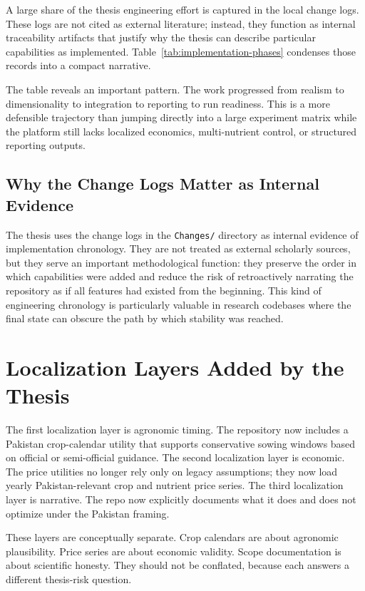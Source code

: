 A large share of the thesis engineering effort is captured in the local change logs. These logs are not cited as external literature; instead, they function as internal traceability artifacts that justify why the thesis can describe particular capabilities as implemented. Table~\ref{tab:implementation-phases} condenses those records into a compact narrative.



The table reveals an important pattern. The work progressed from realism to dimensionality to integration to reporting to run readiness. This is a more defensible trajectory than jumping directly into a large experiment matrix while the platform still lacks localized economics, multi-nutrient control, or structured reporting outputs.

\subsection{Why the Change Logs Matter as Internal Evidence}

The thesis uses the change logs in the \texttt{Changes/} directory as internal evidence of implementation chronology. They are not treated as external scholarly sources, but they serve an important methodological function: they preserve the order in which capabilities were added and reduce the risk of retroactively narrating the repository as if all features had existed from the beginning. This kind of engineering chronology is particularly valuable in research codebases where the final state can obscure the path by which stability was reached.

\section{Localization Layers Added by the Thesis}

The first localization layer is agronomic timing. The repository now includes a Pakistan crop-calendar utility that supports conservative sowing windows based on official or semi-official guidance. The second localization layer is economic. The price utilities no longer rely only on legacy assumptions; they now load yearly Pakistan-relevant crop and nutrient price series. The third localization layer is narrative. The repo now explicitly documents what it does and does not optimize under the Pakistan framing.

These layers are conceptually separate. Crop calendars are about agronomic plausibility. Price series are about economic validity. Scope documentation is about scientific honesty. They should not be conflated, because each answers a different thesis-risk question.

